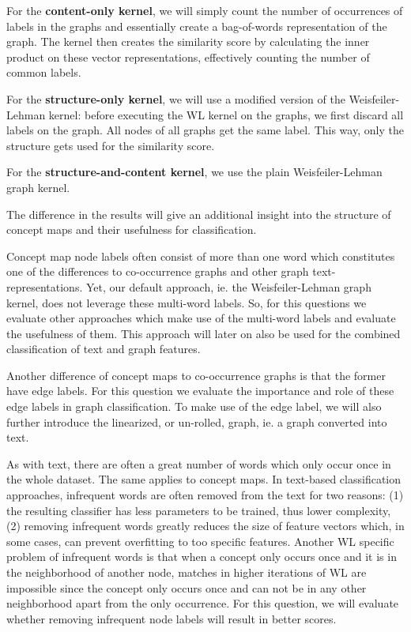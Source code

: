 For the \textbf{content-only kernel}, we will simply count the number of occurrences of labels in the graphs and essentially create a bag-of-words representation of the graph. The kernel then creates the similarity score by calculating the inner product on these vector representations, effectively counting the number of common labels.

For the \textbf{structure-only kernel}, we will use a modified version of the Weisfeiler-Lehman kernel: before executing the WL kernel on the graphs, we first discard all labels on the graph. All nodes of all graphs get the same label. This way, only the structure gets used for the similarity score.

For the \textbf{structure-and-content kernel}, we use the plain Weisfeiler-Lehman graph kernel. 

The difference in the results will give an additional insight into the structure of concept maps and their usefulness for classification.


Concept map node labels often consist of more than one word which constitutes one of the differences to co-occurrence graphs and other graph text-representations.
Yet, our default approach, ie. the Weisfeiler-Lehman graph kernel, does not leverage these multi-word labels.
So, for this questions we evaluate other approaches which make use of the multi-word labels and evaluate the usefulness of them.
This approach will later on also be used for the combined classification of text and graph features.

Another difference of concept maps to co-occurrence graphs is that the former have edge labels.
For this question we evaluate the importance and role of these edge labels in graph classification.
To make use of the edge label, we will also further introduce the linearized, or un-rolled, graph, ie. a graph converted into text.

As with text, there are often a great number of words which only occur once in the whole dataset.
The same applies to concept maps.
In text-based classification approaches, infrequent words are often removed from the text for two reasons: (1) the resulting classifier has less parameters to be trained, thus lower complexity, (2) removing infrequent words greatly reduces the size of feature vectors which, in some cases, can prevent overfitting to too specific features.
Another WL specific problem of infrequent words is that when a concept only occurs once and it is in the neighborhood of another node, matches in higher iterations of WL are impossible since the concept only occurs once and can not be in any other neighborhood apart from the only occurrence.
For this question, we will evaluate whether removing infrequent node labels will result in better scores.

